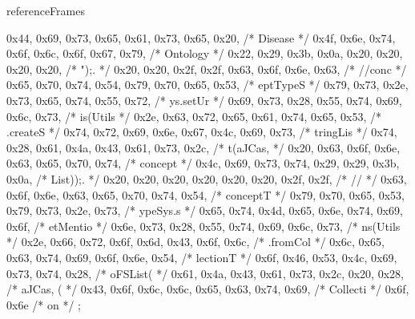 \begin{chunk}{referenceFrames}
{{{{{0x44, 0x69, 0x73, 0x65, 0x61, 0x73, 0x65, 0x20, /* Disease  */
0x4f, 0x6e, 0x74, 0x6f, 0x6c, 0x6f, 0x67, 0x79, /* Ontology */
0x22, 0x29, 0x3b, 0x0a, 0x20, 0x20, 0x20, 0x20, /* ");.     */
0x20, 0x20, 0x2f, 0x2f, 0x63, 0x6f, 0x6e, 0x63, /*   //conc */
0x65, 0x70, 0x74, 0x54, 0x79, 0x70, 0x65, 0x53, /* eptTypeS */
0x79, 0x73, 0x2e, 0x73, 0x65, 0x74, 0x55, 0x72, /* ys.setUr */
0x69, 0x73, 0x28, 0x55, 0x74, 0x69, 0x6c, 0x73, /* is(Utils */
0x2e, 0x63, 0x72, 0x65, 0x61, 0x74, 0x65, 0x53, /* .createS */
0x74, 0x72, 0x69, 0x6e, 0x67, 0x4c, 0x69, 0x73, /* tringLis */
0x74, 0x28, 0x61, 0x4a, 0x43, 0x61, 0x73, 0x2c, /* t(aJCas, */
0x20, 0x63, 0x6f, 0x6e, 0x63, 0x65, 0x70, 0x74, /*  concept */
0x4c, 0x69, 0x73, 0x74, 0x29, 0x29, 0x3b, 0x0a, /* List));. */
0x20, 0x20, 0x20, 0x20, 0x20, 0x20, 0x2f, 0x2f, /*       // */
0x63, 0x6f, 0x6e, 0x63, 0x65, 0x70, 0x74, 0x54, /* conceptT */
0x79, 0x70, 0x65, 0x53, 0x79, 0x73, 0x2e, 0x73, /* ypeSys.s */
0x65, 0x74, 0x4d, 0x65, 0x6e, 0x74, 0x69, 0x6f, /* etMentio */
0x6e, 0x73, 0x28, 0x55, 0x74, 0x69, 0x6c, 0x73, /* ns(Utils */
0x2e, 0x66, 0x72, 0x6f, 0x6d, 0x43, 0x6f, 0x6c, /* .fromCol */
0x6c, 0x65, 0x63, 0x74, 0x69, 0x6f, 0x6e, 0x54, /* lectionT */
0x6f, 0x46, 0x53, 0x4c, 0x69, 0x73, 0x74, 0x28, /* oFSList( */
0x61, 0x4a, 0x43, 0x61, 0x73, 0x2c, 0x20, 0x28, /* aJCas, ( */
0x43, 0x6f, 0x6c, 0x6c, 0x65, 0x63, 0x74, 0x69, /* Collecti */
0x6f, 0x6e                                      /* on */
};

}}}}
\end{chunk}
